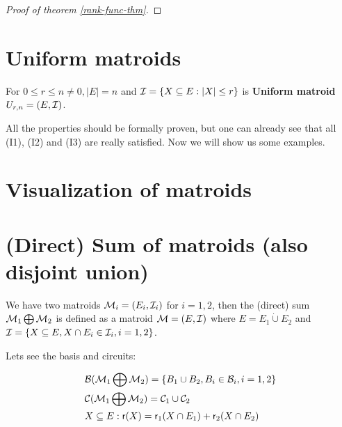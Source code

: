 \begin{proof}[Proof of theorem \ref{rank-func-thm}]
\end{proof}


\section{Uniform matroids}

\begin{defn}
	For $0 \leq r \leq n \neq 0, |E| = n$ and $\mathcal{I} = \{X \subseteq E : |X| \leq r\}$ is \textbf{Uniform matroid} $U_{r,n} = (E, \mathcal{I})$.
\end{defn}

All the properties should be formally proven, but one can already see that all (I1), (I2) and (I3) are really satisfied. Now we will show us some examples.


\section{Visualization of matroids}


\section{(Direct) Sum of matroids (also disjoint union)}

\begin{defn}
	We have two matroids $\mathcal{M}_i = (E_i, \mathcal{I}_i)$ for $i= 1,2$, then the (direct) sum $\mathcal{M}_1 \bigoplus \mathcal{M}_2$ is defined as a matroid $\mathcal{M} = (E, \mathcal{I})$ where $E = E_1 \dot\cup E_2$ and $\mathcal{I} = \{X \subseteq E, X \cap E_i \in \mathcal{I}_i, i=1,2\}$.
\end{defn}

\begin{observ}
	Lets see the basis and circuits:
	
	$$
	\begin{aligned}
		&\mathcal{B}(\mathcal{M}_1 \bigoplus \mathcal{M}_2) = \{B_1 \cup B_2, B_i \in \mathcal{B}_i, i = 1,2\}\\
		&\mathcal{C}(\mathcal{M}_1 \bigoplus \mathcal{M}_2) = \mathcal{C}_1 \cup \mathcal{C}_2\\
		&X \subseteq E : \operatorname{\textsf{r}}(X) = \operatorname{\textsf{r}}_1(X \cap E_1) + \operatorname{\textsf{r}}_2(X \cap E_2)
	\end{aligned}
	$$
\end{observ}